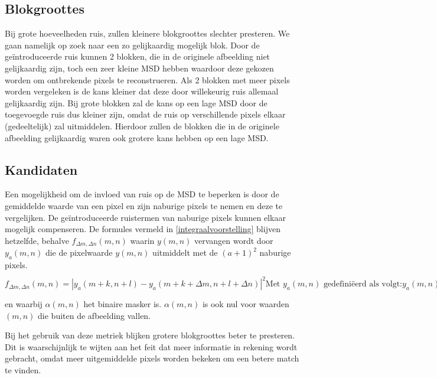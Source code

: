 \documentclass[titlepage]{article}
\begin{document}

\subsection{Blokgroottes} %
Bij grote hoeveelheden ruis, zullen kleinere blokgroottes slechter presteren. We gaan namelijk op zoek naar een zo gelijkaardig mogelijk blok. Door de ge\"introduceerde ruis kunnen 2 blokken, die in de originele afbeelding niet gelijkaardig zijn, toch een zeer kleine MSD hebben waardoor deze gekozen worden om ontbrekende pixels te reconstrueren. Als 2 blokken met meer pixels worden vergeleken is de kans kleiner dat deze door willekeurig ruis allemaal gelijkaardig zijn. Bij grote blokken zal de kans op een lage MSD door de toegevoegde ruis dus kleiner zijn, omdat de ruis op verschillende pixels elkaar (gedeeltelijk) zal uitmiddelen. Hierdoor zullen de blokken die in de originele afbeelding gelijkaardig waren ook grotere kans hebben op een lage MSD.

\subsection{Kandidaten} %
\label{kandidaten}
Een mogelijkheid om de invloed van ruis op de MSD te beperken is door de gemiddelde waarde van een pixel en zijn naburige pixels te nemen en deze te vergelijken. De ge\"introduceerde ruistermen van naburige pixels kunnen elkaar mogelijk compenseren. De formules vermeld in \ref{integraalvoorstelling} blijven hetzelfde, behalve $f_{\Delta m, \Delta n}(m,n)$ waarin $y(m,n)$ vervangen wordt door $y_a(m,n)$ die de pixelwaarde $y(m,n)$ uitmiddelt met de $(a+1)^2$ naburige pixels.
\begin{subequations}
\begin{equation*}
	f_{\Delta m, \Delta n}(m,n) = |y_a(m+k,n+l) - y_a(m+k+\Delta m, n+l+\Delta n)|^2
\end{equation*}
\text{Met $y_a(m,n)$ gedefini\"eerd als volgt:}
\begin{equation*}
	y_a(m,n) = \frac{\sum_{i=-a}^{a} \sum_{j=-a}^{a} y'(m+i,n+j) * \alpha(m+i,n+j)}{\sum_{i=-a}^{a} \sum_{j=-a}^{a} \alpha(m+i,n+j)}
\end{equation*}
\text{waarbij}
\begin{equation*}
	y'(m,n) = \begin{cases}
		y(m,n) &\text{als $(m,n)$ binnen de grenzen van de afbeelding valt} \\
		0 &\text{anders} 	 \\
	\end{cases}
\end{equation*}
\end{subequations}
en waarbij $\alpha(m,n)$ het binaire masker is. $\alpha(m,n)$ is ook nul voor waarden $(m,n)$ die buiten de afbeelding vallen.
\par
Bij het gebruik van deze metriek blijken grotere blokgroottes beter te presteren. Dit is waarschijnlijk te wijten aan het feit dat meer informatie in rekening wordt gebracht, omdat meer uitgemiddelde pixels worden bekeken om een betere match te vinden.
\end{document}
